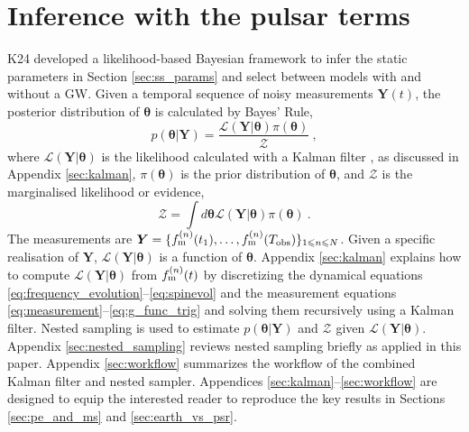 \documentclass[fleqn,usenatbib,useAMS]{mnras}
\begin{document}
\section{Inference with the pulsar terms}\label{sec:pulsar_term}
K24 developed a likelihood-based Bayesian framework to infer the static parameters in Section \ref{sec:ss_params} and select between models with and without a GW. Given a temporal sequence of noisy measurements $\boldsymbol{Y}(t)$, the posterior distribution of $\boldsymbol{\theta}$ is calculated by Bayes' Rule,
\begin{equation}
	p(\boldsymbol{\theta} | \boldsymbol{Y}) = \frac{\mathcal{L}(\boldsymbol{Y} | \boldsymbol{\theta}) \pi(\boldsymbol{\theta})}{\mathcal{Z}} \ , \label{eq:posterior_distrib}
\end{equation}
where $\mathcal{L}(\boldsymbol{Y}| \boldsymbol{\theta})$ is the likelihood calculated with a Kalman filter \citep{Kalman1}, as discussed in Appendix \ref{sec:kalman}, $\pi(\boldsymbol{\theta})$ is the prior distribution of $\boldsymbol{\theta}$, and $\mathcal{Z}$ is the marginalised likelihood or evidence,
\begin{equation}
	\mathcal{Z} = \int d \boldsymbol{\theta} \mathcal{L}(\boldsymbol{Y} | \boldsymbol{\theta})  \pi(\boldsymbol{\theta})  \ . \label{eq:model_evidence}
\end{equation}
The measurements are ${\boldsymbol{Y}} = \{ f^{(n)}_{\rm m}(t_1), \dots, f^{(n)}_{\rm m}(T_{\rm obs})  \}_{1 \leq n \leq N}$. Given a specific realisation of $\boldsymbol{Y}$, $\mathcal{L}(\boldsymbol{Y}| \boldsymbol{\theta})$ is a function of $\boldsymbol{\theta}$. Appendix \ref{sec:kalman} explains how to compute ${\mathcal{L}}({\boldsymbol{Y}}|{\boldsymbol{\theta}})$ from $f_{\rm m}^{(n)}(t)$ by discretizing the dynamical equations \eqref{eq:frequency_evolution}--\eqref{eq:spinevol} and the measurement equations \eqref{eq:measurement}--\eqref{eq:g_func_trig} and solving them recursively using a Kalman filter. Nested sampling \citep{Skilling} is used to estimate $p(\boldsymbol{\theta} | \boldsymbol{Y})$ and $\mathcal{Z}$ given ${\mathcal{L}}({\boldsymbol{Y}}|{\boldsymbol{\theta}})$. Appendix \ref{sec:nested_sampling} reviews nested sampling briefly as applied in this paper. Appendix \ref{sec:workflow} summarizes the workflow of the combined Kalman filter and nested sampler. Appendices \ref{sec:kalman}--\ref{sec:workflow} are designed to equip the interested reader to reproduce the key results in Sections \ref{sec:pe_and_ms} and \ref{sec:earth_vs_psr}. \newline 
 
\end{document}
